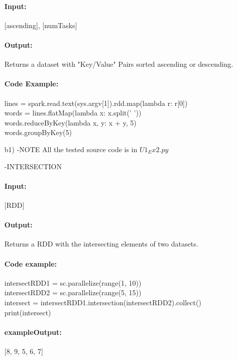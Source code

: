 \documentclass[11pt,a4paper]{scrartcl}
\begin{document}
\begin{itemize}
    		\paragraph*{Input:}
		[ascending], [numTasks]
		
		\paragraph*{Output:}
		Returns a dataset with "Key/Value" Pairs sorted ascending or descending.
		
		\paragraph*{Code Example:}
    		lines = spark.read.text(sys.argv[1]).rdd.map(lambda r: r[0])\\
    		words = lines.flatMap(lambda x: x.split(' '))\\
    		words.reduceByKey(lambda x, y: x + y, 5)\\
    		words.groupByKey(5)\\
    
	\item[b1)]
		-NOTE
		All the tested source code is in $U1_Ex2.py$
	
		-INTERSECTION
		\paragraph*{Input:}
		[RDD]
		
		\paragraph*{Output:}
		Returns a RDD with the intersecting elements of two datasets.
		
		\paragraph*{Code example:}
		intersectRDD1 = sc.parallelize(range(1, 10))\\
    		intersectRDD2 = sc.parallelize(range(5, 15))\\
    		intersect = intersectRDD1.intersection(intersectRDD2).collect()\\
    		print(intersect)\\
		
		\paragraph*{exampleOutput:}
		[8, 9, 5, 6, 7]
		

\end{itemize}
\end{document}
